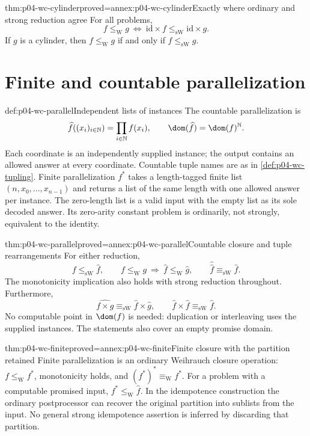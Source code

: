 \begin{hbtheorem}{thm:p04-wc-cylinder}{proved=annex:p04-wc-cylinder}{Exactly where ordinary and strong reduction agree}
For all problems,
\[
 f\leq_{\mathrm W}g\ \Longleftrightarrow\
 \mathrm{id}\times f\leq_{\mathrm{sW}}\mathrm{id}\times g.
\]
If \(g\) is a cylinder, then
\(f\leq_{\mathrm W} g\) if and only if \(f\leq_{\mathrm{sW}}g\).
\end{hbtheorem}

\section{Finite and countable parallelization}
\label{sec:p04-wc-parallel}

\begin{hbdefinition}{def:p04-wc-parallel}{Independent lists of instances}
The countable parallelization is
\[
 \widehat f((x_i)_{i\in\mathbb N})=
                 \prod_{i\in\mathbb N}f(x_i),
 \qquad
 \dom(\widehat f)=\dom(f)^{\mathbb N}.
\]
Each coordinate is an independently supplied instance; the output
contains an allowed answer at every coordinate. Countable tuple names
are as in \cref{def:p04-wc-tupling}.
Finite parallelization \(f^*\) takes a length-tagged finite list
\((n,x_0,\ldots,x_{n-1})\) and returns a list of the same length
with one allowed answer per instance. The zero-length list is a valid
input with the empty list as its sole decoded answer. Its zero-arity
constant problem is ordinarily, not strongly, equivalent to the identity.
\end{hbdefinition}

\begin{hbtheorem}{thm:p04-wc-parallel}{proved=annex:p04-wc-parallel}{Countable closure and tuple rearrangements}
For either reduction,
\[
 f\leq_{\mathrm{sW}}\widehat f,\qquad
 f\leq_{\mathrm W}g\ \Longrightarrow\ \widehat f\leq_{\mathrm W}\widehat g,
 \qquad \widehat{\widehat f}\equiv_{\mathrm{sW}}\widehat f.
\]
The monotonicity implication also holds with strong reduction throughout.
Furthermore,
\[
 \widehat{f\times g}\equiv_{\mathrm{sW}}\widehat f\times\widehat g,
 \qquad \widehat f\times\widehat f\equiv_{\mathrm{sW}}\widehat f.
\]
No computable point in \(\dom(f)\) is needed: duplication or
interleaving uses the supplied instances. The statements also cover an
empty promise domain.
\end{hbtheorem}

\begin{hbtheorem}{thm:p04-wc-finite}{proved=annex:p04-wc-finite}{Finite closure with the partition retained}
Finite parallelization is an ordinary Weihrauch closure operation:
\(f\leq_{\mathrm W}f^*\), monotonicity holds, and
\((f^*)^*\equiv_{\mathrm W}f^*\).
For a problem with a computable promised input,
\(f^*\leq_{\mathrm W}\widehat f\).
In the idempotence construction the ordinary postprocessor can recover
the original partition into sublists from the input. No general strong
idempotence assertion is inferred by discarding that partition.
\end{hbtheorem}

